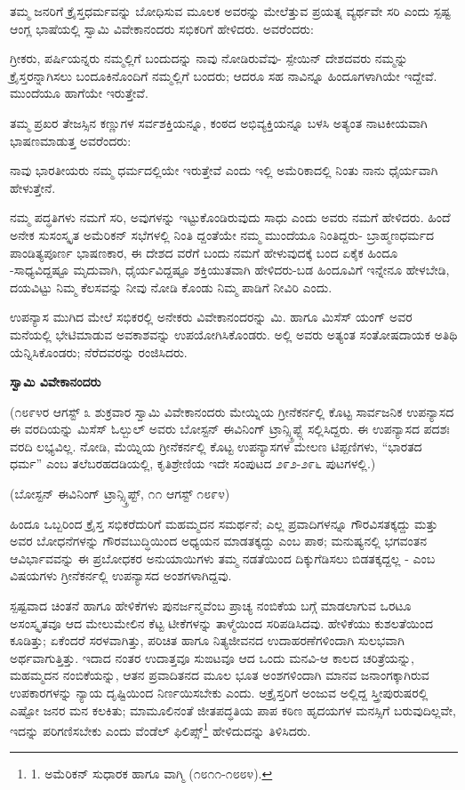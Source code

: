 ತಮ್ಮ ಜನರಿಗೆ ಕ್ರೈಸ್ತಧರ್ಮವನ್ನು ಬೋಧಿಸುವ ಮೂಲಕ ಅವರನ್ನು ಮೇಲೆತ್ತುವ ಪ್ರಯತ್ನ ವ್ಯರ್ಥವೇ ಸರಿ ಎಂದು ಸ್ಪಷ್ಟ ಆಂಗ್ಲ ಭಾಷೆಯಲ್ಲಿ ಸ್ವಾಮಿ ವಿವೇಕಾನಂದರು ಸಭಿಕರಿಗೆ ಹೇಳಿದರು. ಅವರೆಂದರು:

ಗ್ರೀಕರು, ಪರ್ಷಿಯನ್ನರು ನಮ್ಮಲ್ಲಿಗೆ ಬಂದುದನ್ನು ನಾವು ನೋಡಿರುವೆವು- ಸ್ಪೇಯಿನ್ ದೇಶದವರು ನಮ್ಮನ್ನು ಕ್ರೈಸ್ತರನ್ನಾಗಿಸಲು ಬಂದೂಕಿನೊಂದಿಗೆ ನಮ್ಮಲ್ಲಿಗೆ ಬಂದರು; ಆದರೂ ಸಹ ನಾವಿನ್ನೂ ಹಿಂದೂಗಳಾಗಿಯೇ ಇದ್ದೇವೆ. ಮುಂದೆಯೂ ಹಾಗೆಯೇ ಇರುತ್ತೇವೆ.

ತಮ್ಮ ಪ್ರಖರ ತೇಜಸ್ಸಿನ ಕಣ್ಣುಗಳ ಸರ್ವಶಕ್ತಿಯನ್ನೂ, ಕಂಠದ ಅಭಿವ್ಯಕ್ತಿಯನ್ನೂ ಬಳಸಿ ಅತ್ಯಂತ ನಾಟಕೀಯವಾಗಿ ಭಾಷಣಮಾಡುತ್ತ ಅವರೆಂದರು:

ನಾವು ಭಾರತೀಯರು ನಮ್ಮ ಧರ್ಮದಲ್ಲಿಯೇ ಇರುತ್ತೇವೆ ಎಂದು ಇಲ್ಲಿ ಅಮೆರಿಕಾದಲ್ಲಿ ನಿಂತು ನಾನು ಧೈರ್ಯವಾಗಿ ಹೇಳುತ್ತೇನೆ.

ನಮ್ಮ ಪದ್ಧತಿಗಳು ನಮಗೆ ಸರಿ, ಅವುಗಳನ್ನು ಇಟ್ಟುಕೊಂಡಿರುವುದು ಸಾಧು ಎಂದು ಅವರು ನಮಗೆ ಹೇಳಿದರು. ಹಿಂದೆ ಅನೇಕ ಸುಸಂಸ್ಕೃತ ಅಮೆರಿಕನ್ ಸಭೆಗಳಲ್ಲಿ ನಿಂತಿ ದ್ದಂತೆಯೇ ನಮ್ಮ ಮುಂದೆಯೂ ನಿಂತಿದ್ದರು- ಬ್ರಾಹ್ಮಣಧರ್ಮದ ಪಾಂಡಿತ್ಯಪೂರ್ಣ ಭಾಷಣಕಾರ, ಈ ದೇಶದ ವರೆಗೆ ಬಂದು ನಮಗೆ ಹೇಳುವುದಕ್ಕೆ ಬಂದ ಏಕೈಕ ಹಿಂದೂ -ಸಾಧ್ಯವಿದ್ದಷ್ಟೂ ಮೃದುವಾಗಿ, ಧೈರ್ಯವಿದ್ದಷ್ಟೂ ಶಕ್ತಿಯುತವಾಗಿ ಹೇಳಿದರು-ಬಡ ಹಿಂದೂವಿಗೆ ಇನ್ನೇನೂ ಹೇಳಬೇಡಿ, ದಯವಿಟ್ಟು ನಿಮ್ಮ ಕೆಲಸವನ್ನು ನೀವು ನೋಡಿ ಕೊಂಡು ನಿಮ್ಮ ಪಾಡಿಗೆ ನೀವಿರಿ ಎಂದು.

ಉಪನ್ಯಾಸ ಮುಗಿದ ಮೇಲೆ ಸಭಿಕರಲ್ಲಿ ಅನೇಕರು ವಿವೇಕಾನಂದರನ್ನು ಮಿ. ಹಾಗೂ ಮಿಸೆಸ್ ಯಂಗ್ ಅವರ ಮನೆಯಲ್ಲಿ ಭೇಟಿಮಾಡುವ ಅವಕಾಶವನ್ನು ಉಪಯೋಗಿಸಿಕೊಂಡರು. ಅಲ್ಲಿ ಅವರು ಅತ್ಯಂತ ಸಂತೋಷದಾಯಕ ಅತಿಥಿ ಯೆನ್ನಿಸಿಕೊಂಡರು; ನೆರೆದವರನ್ನು ರಂಜಿಸಿದರು.

\begin{center}
\textbf{ಸ್ವಾಮಿ ವಿವೇಕಾನಂದರು}
\end{center}

(೧೮೯೪ರ ಆಗಸ್ಟ್ ೩ ಶುಕ್ರವಾರ ಸ್ವಾಮಿ ವಿವೇಕಾನಂದರು ಮೇಯ್ನಿಯ ಗ್ರೀನೆಕರ್ನಲ್ಲಿ ಕೊಟ್ಟ ಸಾರ್ವಜನಿಕ ಉಪನ್ಯಾಸದ ಈ ವರದಿಯನ್ನು ಮಿಸೆಸ್ ಓಲ್ಬುಲ್ ಅವರು ಬೋಸ್ಟನ್ ಈವಿನಿಂಗ್ ಟ್ರಾನ್ಸ್ಕ್ರಿಪ್ಟ್ಗೆ ಸಲ್ಲಿಸಿದ್ದರು. ಈ ಉಪನ್ಯಾಸದ ಪದಶಃ ವರದಿ ಲಭ್ಯವಿಲ್ಲ. ನೋಡಿ, ಮೆಯ್ನಿಯ ಗ್ರೀನೆಕರ್ನಲ್ಲಿ ಕೊಟ್ಟ ಉಪನ್ಯಾಸಗಳ ಮೇಲಣ ಟಿಪ್ಪಣಿಗಳು, “ಭಾರತದ ಧರ್ಮ” ಎಂಬ ತಲೆಬರಹದಡಿಯಲ್ಲಿ, ಕೃತಿಶ್ರೇಣಿಯ ಇದೇ ಸಂಪುಟದ ೨೯೨-೨೯೬ ಪುಟಗಳಲ್ಲಿ.)

\begin{center}
(ಬೋಸ್ಟನ್ ಈವಿನಿಂಗ್ ಟ್ರಾನ್ಸ್ಕ್ರಿಪ್ಟ್, ೧೧ ಆಗಸ್ಟ್ ೧೮೯೪)
\end{center}

ಹಿಂದೂ ಒಬ್ಬರಿಂದ ಕ್ರೈಸ್ತ ಸಭಿಕರೆದುರಿಗೆ ಮಹಮ್ಮದನ ಸಮರ್ಥನೆ; ಎಲ್ಲ ಪ್ರವಾದಿಗಳನ್ನೂ ಗೌರವಿಸತಕ್ಕದ್ದು ಮತ್ತು ಅವರ ಬೋಧನೆಗಳನ್ನು ಗೌರವಬುದ್ಧಿಯಿಂದ ಅಧ್ಯಯನ ಮಾಡತಕ್ಕದ್ದು ಎಂಬ ಪಾಠ; ಮನುಷ್ಯನಲ್ಲಿ ಭಗವಂತನ ಆವಿರ್ಭಾವವನ್ನು ಈ ಪ್ರಬೋಧಕರ ಅನುಯಾಯಿಗಳು ತಮ್ಮ ನಡತೆಯಿಂದ ದಿಕ್ಕುಗೆಡಿಸಲು ಬಿಡತಕ್ಕದ್ದಲ್ಲ - ಎಂಬ ವಿಷಯಗಳು ಗ್ರೀನೆಕರ್ನಲ್ಲಿ ಉಪನ್ಯಾಸದ ಅಂಶಗಳಾಗಿದ್ದವು.

ಸ್ಪಷ್ಟವಾದ ಚಿಂತನೆ ಹಾಗೂ ಹೇಳಿಕೆಗಳು ಪುನರ್ಜನ್ಮವೆಂಬ ಪ್ರಾಚ್ಯ ನಂಬಿಕೆಯ ಬಗ್ಗೆ ಮಾಡಲಾಗುವ ಒರಟೂ ಅಸಂಸ್ಕೃತವೂ ಆದ ಮೇಲುಮೇಲಿನ ಕೆಟ್ಟ ಟೀಕೆಗಳನ್ನು ತಾಳ್ಮೆಯಿಂದ ಸರಿಪಡಿಸಿದವು. ಹೇಳಿಕೆಯು ಕುಶಲತೆಯಿಂದ ಕೂಡಿತ್ತು; ಏಕೆಂದರೆ ಸರಳವಾಗಿತ್ತು, ಪರಿಚಿತ ಹಾಗೂ ನಿತ್ಯಜೀವನದ ಉದಾಹರಣೆಗಳಿಂದಾಗಿ ಸುಲಭವಾಗಿ ಅರ್ಥವಾಗುತ್ತಿತ್ತು. ಇದಾದ ನಂತರ ಉದಾತ್ತವೂ ಸುಙಟವೂ ಆದ ಒಂದು ಮನವಿ-ಆ ಕಾಲದ ಚರಿತ್ರೆಯನ್ನು, ಮಹಮ್ಮದನ ನಂಬಿಕೆಯನ್ನು, ಆತನ ಪ್ರವಾದಿತನದ ಮೂಲ ಭೂತ ಅಂಶಗಳಿಂದಾಗಿ ಮಾನವ ಜನಾಂಗಕ್ಕಾಗಿರುವ ಉಪಕಾರಗಳನ್ನು ನ್ಯಾಯ ದೃಷ್ಟಿಯಿಂದ ನಿರ್ಣಯಿಸಬೇಕು ಎಂದು. ಅಕ್ರೈಸ್ತರಿಗೆ ಅಂಜುವ ಅಲ್ಲಿದ್ದ ಸ್ತ್ರೀಪುರುಷರಲ್ಲಿ ಎಷ್ಟೋ ಜನರ ಮನ ಕಲಕಿತು; ಮಾಮೂಲಿನಂತೆ ಜೀತಪದ್ಧತಿಯ ಪಾಪ ಕಠಿಣ ಹೃದಯಗಳ ಮನಸ್ಸಿಗೆ ಬರುವುದಿಲ್ಲವೇ, ಇದನ್ನು ಪರಿಗಣಿಸಬೇಕು ಎಂದು ವೆಂಡೆಲ್ ಫಿಲಿಪ್ಸ್\footnote{1. ಅಮೆರಿಕನ್ ಸುಧಾರಕ ಹಾಗೂ ವಾಗ್ಮಿ (೧೮೧೧-೧೮೮೪).} ಹೇಳಿದುದನ್ನು ತಿಳಿಸಿದರು.

